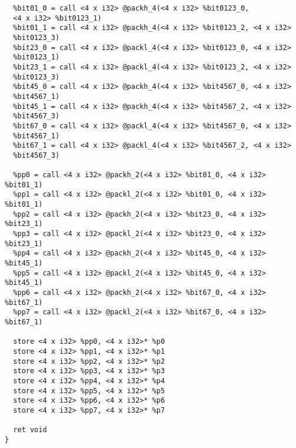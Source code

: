 \begin{lstlisting}
  %bit01_0 = call <4 x i32> @packh_4(<4 x i32> %bit0123_0,
  <4 x i32> %bit0123_1)
  %bit01_1 = call <4 x i32> @packh_4(<4 x i32> %bit0123_2, <4 x i32>
  %bit0123_3)
  %bit23_0 = call <4 x i32> @packl_4(<4 x i32> %bit0123_0, <4 x i32>
  %bit0123_1)
  %bit23_1 = call <4 x i32> @packl_4(<4 x i32> %bit0123_2, <4 x i32>
  %bit0123_3)
  %bit45_0 = call <4 x i32> @packh_4(<4 x i32> %bit4567_0, <4 x i32>
  %bit4567_1)
  %bit45_1 = call <4 x i32> @packh_4(<4 x i32> %bit4567_2, <4 x i32>
  %bit4567_3)
  %bit67_0 = call <4 x i32> @packl_4(<4 x i32> %bit4567_0, <4 x i32>
  %bit4567_1)
  %bit67_1 = call <4 x i32> @packl_4(<4 x i32> %bit4567_2, <4 x i32>
  %bit4567_3)

  %pp0 = call <4 x i32> @packh_2(<4 x i32> %bit01_0, <4 x i32> %bit01_1)
  %pp1 = call <4 x i32> @packl_2(<4 x i32> %bit01_0, <4 x i32> %bit01_1)
  %pp2 = call <4 x i32> @packh_2(<4 x i32> %bit23_0, <4 x i32> %bit23_1)
  %pp3 = call <4 x i32> @packl_2(<4 x i32> %bit23_0, <4 x i32> %bit23_1)
  %pp4 = call <4 x i32> @packh_2(<4 x i32> %bit45_0, <4 x i32> %bit45_1)
  %pp5 = call <4 x i32> @packl_2(<4 x i32> %bit45_0, <4 x i32> %bit45_1)
  %pp6 = call <4 x i32> @packh_2(<4 x i32> %bit67_0, <4 x i32> %bit67_1)
  %pp7 = call <4 x i32> @packl_2(<4 x i32> %bit67_0, <4 x i32> %bit67_1)

  store <4 x i32> %pp0, <4 x i32>* %p0
  store <4 x i32> %pp1, <4 x i32>* %p1
  store <4 x i32> %pp2, <4 x i32>* %p2
  store <4 x i32> %pp3, <4 x i32>* %p3
  store <4 x i32> %pp4, <4 x i32>* %p4
  store <4 x i32> %pp5, <4 x i32>* %p5
  store <4 x i32> %pp6, <4 x i32>* %p6
  store <4 x i32> %pp7, <4 x i32>* %p7

  ret void
}
\end{lstlisting}

